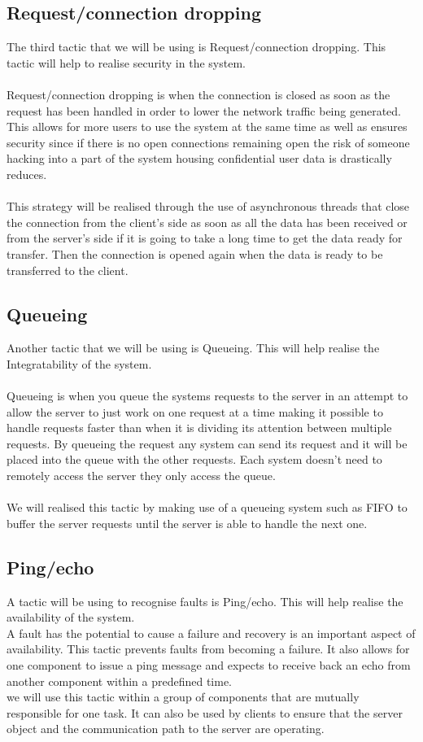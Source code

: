 \documentclass[a4paper]{article}
\begin{document}
\subsection{Request/connection dropping}
The third tactic that we will be using is Request/connection dropping. This tactic will help to realise security in the system.
\\
\\ Request/connection dropping is when the connection is closed as soon as the request has been handled in order to lower the network traffic being generated. This allows for more users to use the system at the same time as well as ensures security since if there is no open connections remaining open the risk of someone hacking into a part of the system housing confidential user data is drastically reduces. 
\\
\\This strategy will be realised through the use of asynchronous threads that close the connection from the client’s side as soon as all the data has been received or from the server’s side if it is going to take a long time to get the data ready for transfer. Then the connection is opened again when the data is ready to be transferred to the client. 
\\
\subsection{Queueing}
Another tactic that we will be using is Queueing. This will help realise the Integratability of the system.
\\
\\Queueing is when you queue the systems requests to the server in an attempt to allow the server to just work on one request at a time making it possible to handle requests faster than when it is dividing its attention between multiple requests. By queueing the request any system can send its request and it will be placed into the queue with the other requests. Each system doesn’t need to remotely access the server they only access the queue. 
\\
\\We will realised this tactic by making use of a queueing system such as FIFO to buffer the server requests until the server is able to handle the next one. 
\\
\subsection{Ping/echo}
A tactic will be using to recognise faults is Ping/echo. This will help  realise the availability of the system.
\\A fault has the potential to cause a failure and recovery is an important aspect of availability. This tactic prevents faults from becoming a failure. It also allows for one component to issue a ping message and expects to receive back an echo from another component within a predefined time.
\\we will use this tactic within a group of components that are mutually responsible for one task. It can also be used by clients to ensure that the server object and the communication path to the server are operating. 
\end{document}
